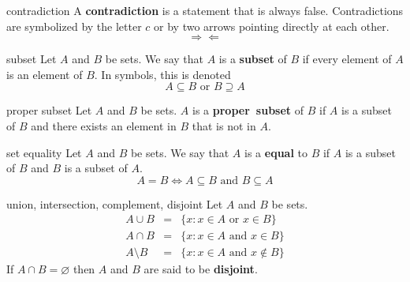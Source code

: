 \documentclass[avery5371,grid]{flashcards}
\begin{document}
\begin{flashcard}[Definition]{contradiction}
A \textbf{contradiction} is a statement that is always false.
Contradictions are symbolized by the letter $c$ or by two arrows
pointing directly at each other.
\begin{equation*}
\Rightarrow \Leftarrow
\end{equation*}
\end{flashcard}



\begin{flashcard}[Definition]{subset}
Let $A$ and $B$ be sets.  We say that $A$ is a \mbox{\textbf{subset}}
of $B$ if every element of $A$ is an element of $B$.  In symbols, this
is denoted
\begin{equation*}
A \subseteq B \textrm{ or } B \supseteq A
\end{equation*}
\end{flashcard}

\begin{flashcard}[Definition]{proper subset}
Let $A$ and $B$ be sets. $A$ is a \mbox{\textbf{proper subset}} of $B$
if $A$ is a subset of $B$ and there exists an element in $B$
that is not in $A$.
\end{flashcard}

\begin{flashcard}[Definition]{set equality}
Let $A$ and $B$ be sets.  We say that $A$ is a \mbox{\textbf{equal}} to $B$
if $A$ is a subset of $B$ and $B$ is a subset of $A$.
\begin{equation*}
A = B \Leftrightarrow A \subseteq B \textrm{ and } B \subseteq A
\end{equation*}
\end{flashcard}

\begin{flashcard}[Definition]{union, intersection, complement, disjoint}
Let $A$ and $B$ be sets.
\begin{eqnarray*}
A \cup B &=& \{ x: x \in A \textrm{ or } x \in B \} \\
A \cap B &=& \{ x: x \in A \textrm{ and } x \in B \} \\
A \setminus B &=& \{ x: x \in A \textrm{ and } x \not \in B \}
\end{eqnarray*}
If $A \cap B = \varnothing$ then $A$ and $B$ are said to be
\mbox{\textbf{disjoint}}.
\end{flashcard}
\end{document}
